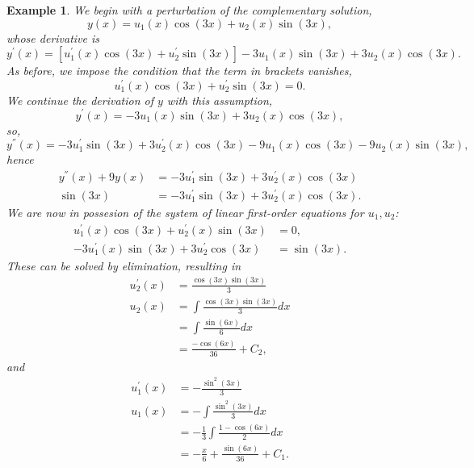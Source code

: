 \documentclass[11pt]{amsart}
\newtheorem{example}{Example}
\numberwithin{equation}{section}
\begin{document}
\begin{example}
We begin with a perturbation of the complementary solution, 
\begin{equation*}
y(x)=u_{1}(x)\cos(3x)+u_2(x)\sin(3x),
\end{equation*}
whose derivative is 
\begin{equation*}
y^{'}(x)=[u_{1}^{'}(x)\cos(3x)+u_{2}^{'}\sin(3x)] -3u_1(x)\sin(3x)+3u_2(x)\cos(3x).
\end{equation*}
As before, we impose the condition that the term in brackets vanishes, 
\begin{equation}\label{example2_step1}
u_{1}^{'}(x)\cos(3x)+u_{2}^{'}\sin(3x) =0.
\end{equation}
We continue the derivation of $y$ with this assumption, 
\begin{equation*}
y^{'}(x)=-3u_1(x)\sin(3x)+3u_2(x)\cos(3x),
\end{equation*}
so,
\begin{equation*}
y^{''}(x) = -3u_{1}^{'}\sin(3x)+3u_{2}^{'}(x)\cos(3x) -9u_1(x)\cos(3x)-9u_2(x)\sin(3x),
\end{equation*}
hence 
\begin{align}
\nonumber
y^{''}(x)+9y(x) & = -3u_{1}^{'}\sin(3x)+3u_{2}^{'}(x)\cos(3x) \\
\label{example2_step2}
\sin(3x) & = -3u_{1}^{'}\sin(3x)+3u_{2}^{'}(x)\cos(3x).
\end{align}
We are now in possesion of the system of linear first-order equations for $u_1,u_2$: 
\begin{align*}
u_{1}^{'}(x)\cos(3x)+u_{2}^{'}(x)\sin(3x) & = 0, \\
-3u_{1}^{'}(x)\sin(3x)+3u_{2}^{'}\cos(3x) & = \sin(3x).
\end{align*}
These can be solved by elimination, resulting in 
\begin{align*}
u_{2}^{'}(x) & =  \frac{\cos(3x)\sin(3x)}{3} \\
u_{2}(x) & = \int \frac{\cos(3x)\sin(3x)}{3} dx \\
& = \int \frac{\sin(6x)}{6} dx \\
& = \frac{-\cos(6x)}{36} + C_2,
\end{align*}
and
\begin{align*}
u_{1}^{'}(x) & = -\frac{\sin^{2}(3x)}{3} \\
u_1(x) & =- \int \frac{\sin^{2}(3x)}{3}  dx \\
& = -\frac{1}{3}\int \frac{1-\cos(6x)}{2} dx\\
& = -\frac{x}{6} + \frac{\sin(6x)}{36} + C_1.
\end{align*}

\end{example}
\end{document}
